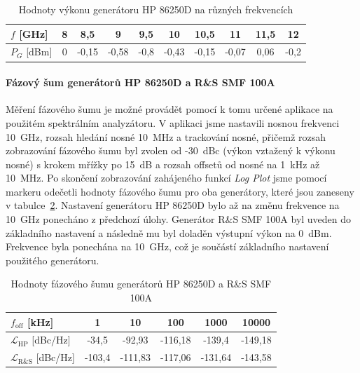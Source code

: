 \documentclass[11pt,a4paper]{article}
\begin{document}
\begin{table}[!ht]
\begin{center}
\begin{tabular}{| l || c | c | c | c | c | c | c | c | c |}
    \hline
    $f$ [GHz] & 8 & 8,5 & 9 & 9,5 & 10 & 10,5 & 11 & 11,5 & 12 \\
    \hline
    $P_G$ [dBm] & 0 & -0,15 & -0,58 & -0,8 & -0,43 & -0,15 & -0,07 & 0,06 & -0,2 \\
    \hline
\end{tabular}
\caption{Hodnoty výkonu generátoru HP 86250D na různých frekvencích}
\label{table:stability-HP}
\end{center}
\end{table}

\paragraph*{Fázový šum generátorů HP 86250D a R\&S SMF 100A} Měření fázového šumu je možné provádět pomocí k tomu určené aplikace na použitém spektrálním analyzátoru. V aplikaci jsme nastavili nosnou frekvenci 10~GHz, rozsah hledání nosné 10~MHz a trackování nosné, přičemž rozsah zobrazování fázového šumu byl zvolen od -30~dBc (výkon vztažený k výkonu nosné) s krokem mřížky po 15~dB a rozsah offsetů od nosné na 1~kHz až 10~MHz. Po skončení zobrazování zahájeného funkcí \emph{Log Plot} jsme pomocí markeru odečetli hodnoty fázového šumu pro oba generátory, které jsou zaneseny v tabulce~\ref{table:phase-noise-HP-and-RS}. Nastavení generátoru HP 86250D bylo až na změnu frekvence na 10~GHz ponecháno z předchozí úlohy. Generátor R\&S SMF 100A byl uveden do základního nastavení a následně mu byl doladěn výstupní výkon na 0~dBm. Frekvence byla ponechána na 10~GHz, což je součástí základního nastavení použitého generátoru.

\begin{table}[!ht]
\begin{center}
\begin{tabular}{| l || c | c | c | c | c |}
    \hline
    $f_{\mathrm{off}}$ [kHz] & 1 & 10 & 100 & 1000 & 10000 \\
    \hline
    $\mathcal L_{\mathrm{HP}}$ [dBc/Hz] & -34,5 & -92,93 & -116,18 & -139,4 & -149,18 \\
    \hline
    $\mathcal L_{\mathrm{R\&S}}$ [dBc/Hz] & -103,4 & -111,83 & -117,06 & -131,64 & -143,58 \\
    \hline
\end{tabular}
\caption{Hodnoty fázového šumu generátorů HP 86250D a R\&S SMF 100A}
\label{table:phase-noise-HP-and-RS}
\end{center}
\end{table}
\end{document}

